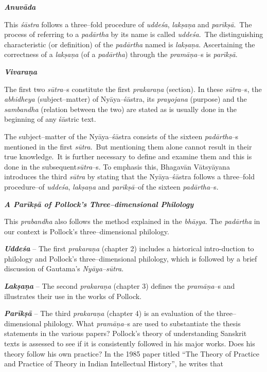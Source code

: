 \textit{\textbf{Anuvāda}}

This \textit{śāstra} follows a three–fold procedure of \textit{uddeśa}, \textit{lakṣaṇa} and \textit{parīkṣā}.~The process of referring to a \textit{padārtha} by its name is called \textit{uddeśa}.~The distinguishing characteristic (or definition) of the \textit{padārtha} named is\textit{ lakṣaṇa}. Ascertaining the correctness of a \textit{lakṣaṇa} (of a \textit{padārtha}) through the \textit{pramāṇa}–s is \textit{parīkṣā}.

\textit{\textbf{Vivaraṇa}}

The first two \textit{sūtra}–s constitute the first \textit{prakaraṇa} (section). In these \textit{sūtra}–s, the \textit{abhidheya} (subject–matter) of Nyāya–śāstra, its \textit{prayojana} (purpose) and the \textit{sambandha} (relation between the two) are stated as is usually done in the beginning of any śāstric text.

The subject–matter of the Nyāya–śāstra consists of the sixteen \textit{padārtha}–s mentioned in the first \textit{sūtra}.~But mentioning them alone cannot result in their true knowledge.~It is further necessary to define and examine them and this is done in the subsequent\break \textit{sūtra}–s. To emphasis this, Bhagavān Vātsyāyana introduces the third \textit{sūtra} by stating that the Nyāya–śāstra follows a three–fold procedure–of \textit{uddeśa}, \textit{lakṣaṇa} and \textit{parīkṣā}–of the sixteen \textit{padārtha}–s.

\textbf{\textit{A Parīkṣā of Pollock’s Three–dimensional Philology}}

This \textit{prabandha} also follows the method explained in the \textit{bhāṣya}. The \textit{padārtha} in our context is Pollock’s three–dimensional philology.

\textit{\textbf{Uddeśa}} – The first \textit{prakaraṇa} (chapter 2) includes a historical intro-\break duction to philology and Pollock’s three–dimensional philology, which is followed by a brief discussion of Gautama’s \textit{Nyāya–sūtra}.


\textit{\textbf{Lakṣaṇa }} – The second \textit{prakaraṇa} (chapter 3) defines the \textit{pramāṇa}–s and illustrates their use in the works of Pollock.

\textit{\textbf{Parīkṣā }} – The third \textit{prakaraṇa} (chapter 4) is an evaluation of the three–dimensional philology. What \textit{pramāṇa}–s are used to substantiate the thesis statements in the various papers? Pollock’s theory of understanding Sanskrit texts is assessed to see if it is consistently followed in his major works. Does his theory follow his own practice? In the 1985 paper titled “The Theory of Practice and Practice of Theory in Indian Intellectual History”, he writes that

